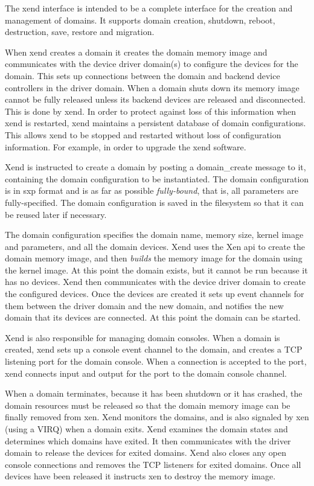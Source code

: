 \documentclass[11pt,twoside,final,openright]{report}
\begin{document}
The xend interface is intended to be a complete interface for the creation
and management of domains. It supports domain creation, shutdown, reboot,
destruction, save, restore and migration.

When xend creates a domain it creates the domain memory image and communicates
with the device driver domain(s) to configure the devices for the domain.
This sets up connections between the domain and backend device controllers
in the driver domain. When a domain shuts down its memory image cannot be fully released
unless its backend devices are released and disconnected. This is done by xend.
In order to protect against loss of this information when xend is restarted,
xend maintains a persistent database of domain configurations. This allows
xend to be stopped and restarted without loss of configuration information.
For example, in order to upgrade the xend software.

Xend is instructed to create a domain by posting a domain\_create message to it,
containing the domain configuration to be instantiated. The domain configuration
is in sxp format and is as far as possible {\em fully-bound}, that is, all
parameters are fully-specified. The domain configuration is saved in the filesystem
so that it can be reused later if necessary.

The domain configuration specifies the domain name, memory size, kernel image
and parameters, and all the domain devices. Xend uses the Xen api to create
the domain memory image, and then {\em builds} the memory image for the domain
using the kernel image. At this point the domain exists, but it cannot be run because
it has no devices. Xend then communicates with the device driver domain to create
the configured devices. Once the devices are created it sets up event channels
for them between the driver domain and the new domain, and notifies the new domain
that its devices are connected. At this point the domain can be started.

Xend is also responsible for managing domain consoles. When a domain is created,
xend sets up a console event channel to the domain, and creates a TCP listening port
for the domain console. When a connection is accepted to the port, xend
connects input and output for the port to the domain console channel.

When a domain terminates, because it has been shutdown or it has crashed, the
domain resources must be released so that the domain memory image can be
finally removed from xen. Xend monitors the domains, and is also signaled by
xen (using a VIRQ) when a domain exits. Xend examines the domain states and
determines which domains have exited. It then communicates with the driver domain
to release the devices for exited domains. Xend also closes any open console
connections and removes the TCP listeners for exited domains.
Once all devices have been released it instructs xen to destroy the memory image.
\end{document}
